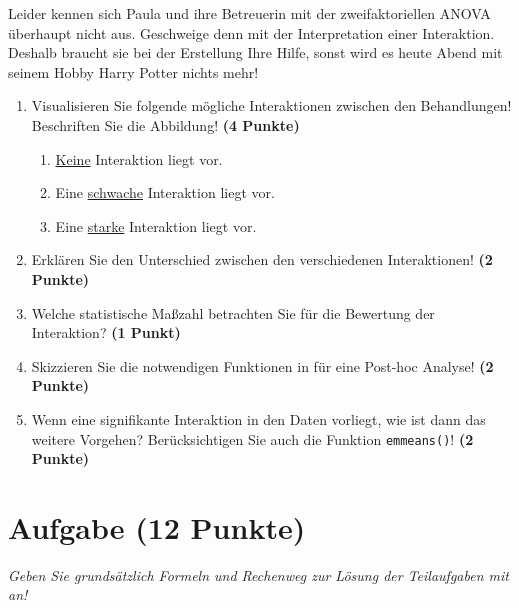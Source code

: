 \documentclass[a4paper, 9pt]{scrartcl}\usepackage[]{graphicx}\usepackage[]{xcolor}
\begin{document}
\vspace{1ex}

Leider kennen sich Paula und ihre Betreuerin mit der zweifaktoriellen ANOVA überhaupt nicht aus. Geschweige denn mit der Interpretation einer Interaktion. Deshalb braucht sie bei der Erstellung Ihre Hilfe, sonst wird es heute Abend mit seinem Hobby Harry Potter nichts mehr! 

\begin{enumerate}
\item Visualisieren Sie folgende mögliche Interaktionen zwischen den Behandlungen! Beschriften Sie die Abbildung! \textbf{(4 Punkte)}
\begin{enumerate}
\item \underline{Keine} Interaktion liegt vor.
\item Eine \underline{schwache} Interaktion liegt vor. 
\item Eine \underline{starke} Interaktion liegt vor. 
\end{enumerate}
\item Erklären Sie den Unterschied zwischen den verschiedenen Interaktionen! \textbf{(2 Punkte)}
\item Welche statistische Maßzahl betrachten Sie für die Bewertung der Interaktion? \textbf{(1 Punkt)}
\item Skizzieren Sie die notwendigen Funktionen in \Rlogo für eine Post-hoc Analyse! \textbf{(2 Punkte)} 
\item Wenn eine signifikante Interaktion in den Daten vorliegt, wie ist dann das weitere Vorgehen? Berücksichtigen Sie auch die Funktion \texttt{emmeans()}! \textbf{(2 Punkte)}
\end{enumerate}

 
\clearpage

\section{Aufgabe \hfill (12 Punkte)}

\textit{Geben Sie grundsätzlich Formeln und Rechenweg zur Lösung der Teilaufgaben mit an!} \\[1Ex]
 
\end{document}
